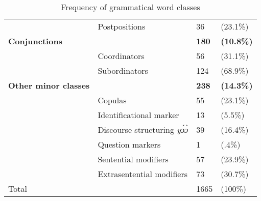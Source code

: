 \begin{table}
\begin{tabular}{ll|ll}
 & Postpositions   &   36 &   (23.1\%) \\
 {\bfseries Conjunctions} &  & {\bfseries 180} & {\bfseries (10.8\%)} \\
 & Coordinators   &   56 &   (31.1\%) \\
 & Subordinators   &   124 &   (68.9\%) \\
 {\bfseries Other minor classes} &  & {\bfseries 238} & {\bfseries (14.3\%)} \\
 & Copulas  &   55 &   (23.1\%) \\
 & Identificational marker  &    13 &   (5.5\%) \\
  & Discourse structuring {\itshape yɔ́ɔ̀}  &   39 &   (16.4\%) \\
 & Question markers  &    1 &   (.4\%) \\
 & Sentential modifiers  &   57 &   (23.9\%) \\
 & Extrasentential modifiers  &    73 &   (30.7\%) \\
 \midrule
  Total & & 1665 & (100\%) \\ %
 \midrule
\end{tabular}
\caption{Frequency of grammatical word classes}
\label{Tab:POSnogram}
\end{table}




